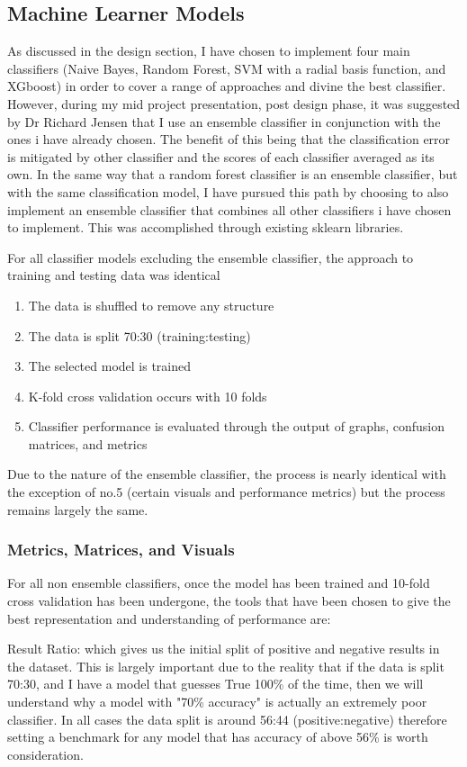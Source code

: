 \documentclass[11pt, a4paper]{article}
\begin{document}
\subsection{Machine Learner Models}
As discussed in the design section, I have chosen to implement four main classifiers (Naive Bayes, Random Forest, SVM with a radial basis function, and XGboost) in order to cover a range of approaches and divine the best classifier. However, during my mid project presentation, post design phase, it was suggested by Dr Richard Jensen that I use an ensemble classifier in conjunction with the ones i have already chosen. The benefit of this being that the classification error is mitigated by other classifier and the scores of each classifier averaged as its own. In the same way that a random forest classifier is an ensemble classifier, but with the same classification model, I have pursued this path by choosing to also implement an ensemble classifier that combines all other classifiers i have chosen to implement. This was accomplished through existing sklearn libraries.

For all classifier models excluding the ensemble classifier, the approach to training and testing data was identical 
\begin{enumerate}
\item The data is shuffled to remove any structure
\item The data is split 70:30 (training:testing)
\item The selected model is trained
\item K-fold cross validation occurs with 10 folds
\item Classifier performance is evaluated through the output of graphs, confusion matrices, and metrics
\end{enumerate}
Due to the nature of the ensemble classifier, the process is nearly identical with the exception of no.5 (certain visuals and performance metrics) but the process remains largely the same.

\subsubsection{Metrics, Matrices, and Visuals}
For all non ensemble classifiers, once the model has been trained and 10-fold cross validation has been undergone, the tools that have been chosen to give the best representation and understanding of performance are:

Result Ratio: which gives us the initial split of positive and negative results in the dataset. This is largely important due to the reality that if the data is split 70:30, and I have a model that guesses True 100\% of the time, then we will understand why a model with "70\% accuracy" is actually an extremely poor classifier. In all cases the data split is around 56:44 (positive:negative) therefore setting a benchmark for any model that has accuracy of above 56\% is worth consideration.
\end{document}
